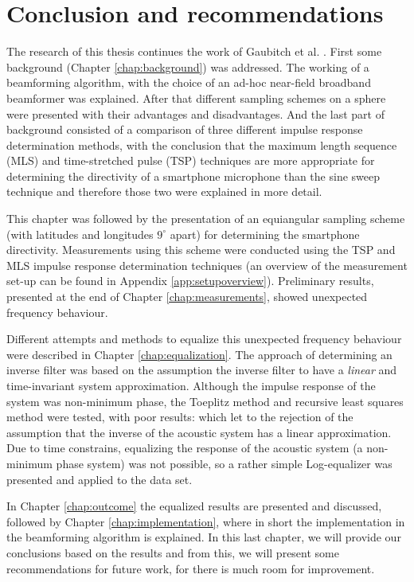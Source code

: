 \chapter{Conclusion and recommendations}
\label{chap:conclusion}
The research of this thesis continues the work of Gaubitch et al. \cite{Gaubitch2014}.
First some background (Chapter \ref{chap:background}) was addressed. 
The working of a beamforming algorithm, with the choice of an ad-hoc near-field broadband beamformer was explained.
After that different sampling schemes on a sphere were presented with their advantages and disadvantages.
And the last part of background consisted of a comparison of three different impulse response determination methods, with the conclusion that the maximum length sequence (MLS) and time-stretched pulse (TSP) techniques are more appropriate for determining the directivity of a smartphone microphone than the sine sweep technique and therefore those two were explained in more detail.

This chapter was followed by the presentation of an equiangular sampling scheme (with latitudes and longitudes $9^\circ$ apart) for determining the smartphone directivity.
Measurements using this scheme were conducted using the TSP and MLS impulse response determination techniques (an overview of the measurement set-up can be found in Appendix \ref{app:setupoverview}).
Preliminary results, presented at the end of Chapter \ref{chap:measurements}, showed unexpected frequency behaviour.

Different attempts and methods to equalize this unexpected frequency behaviour were described in Chapter \ref{chap:equalization}.
The approach of determining an inverse filter was based on the assumption the inverse filter to have a \textit{linear} and time-invariant system approximation.
Although the impulse response of the system was non-minimum phase, the Toeplitz method and recursive least squares method were tested, with poor results: which let to the rejection of the assumption that the inverse of the acoustic system has a linear approximation.
Due to time constrains, equalizing the response of the acoustic system (a non-minimum phase system) was not possible, so a rather simple Log-equalizer was presented and applied to the data set.

In Chapter \ref{chap:outcome} the equalized results are presented and discussed, followed by Chapter \ref{chap:implementation}, where in short the implementation in the beamforming algorithm is explained.
In this last chapter, we will provide our conclusions based on the results and from this, we will present some recommendations for future work, for there is much room for improvement.

